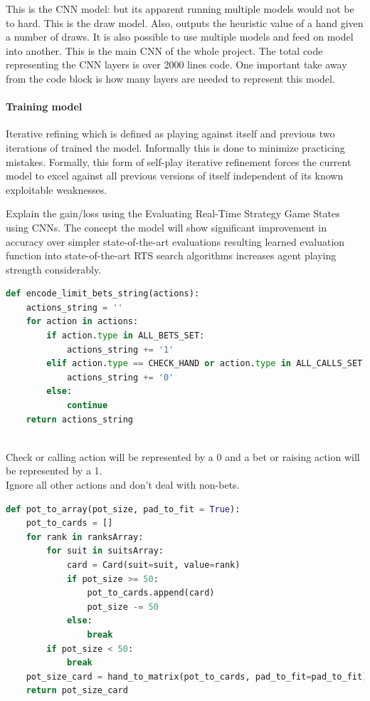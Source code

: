 \documentclass[review]{elsarticle}
\begin{document}
This is the CNN model: but its apparent running multiple models would not be to hard.
This is the draw model. Also, outputs the heuristic value of a hand given a number of draws.
It is also possible to use multiple models and feed on model into another. 
This is the main CNN of the whole project. The total code representing the CNN layers is over 2000 lines code.
One important take away from the code block is how many layers are needed to represent this model. 

\paragraph{Training model} 

Iterative refining which is defined as playing against itself and previous 
two iterations of trained the model. Informally this is done to minimize 
practicing mistakes. Formally, this form of self-play iterative refinement 
forces the current model to excel against all previous versions of itself 
independent of its known exploitable weaknesses. 

Explain the gain/loss using the Evaluating Real-Time Strategy Game States using CNNs. 
The concept the model will show significant improvement in accuracy over simpler 
state-of-the-art evaluations resulting learned evaluation function into 
state-of-the-art RTS search algorithms increases agent playing 
strength considerably.


\begin{lstlisting}[language=Python, caption=Limit Texas Hold'em betting actions]
def encode_limit_bets_string(actions):
    actions_string = ''
    for action in actions:
        if action.type in ALL_BETS_SET:
            actions_string += '1'
        elif action.type == CHECK_HAND or action.type in ALL_CALLS_SET:
            actions_string += '0'
        else:
            continue
    return actions_string
\end{lstlisting}
~\cite{moscow25} \\
Check or calling action will be represented by a 0 and a 
bet or raising action will be represented by a 1.\\
Ignore all other actions and don't deal with non-bets. \\ 

\begin{lstlisting}[language=Python, caption=Limit Texas Hold'em betting actions]
def pot_to_array(pot_size, pad_to_fit = True):
    pot_to_cards = []
    for rank in ranksArray:
        for suit in suitsArray:
            card = Card(suit=suit, value=rank)
            if pot_size >= 50:
                pot_to_cards.append(card)
                pot_size -= 50
            else:
                break
        if pot_size < 50:
            break
    pot_size_card = hand_to_matrix(pot_to_cards, pad_to_fit=pad_to_fit)
    return pot_size_card
\end{lstlisting}
~\cite{moscow25} \\
\end{document}
